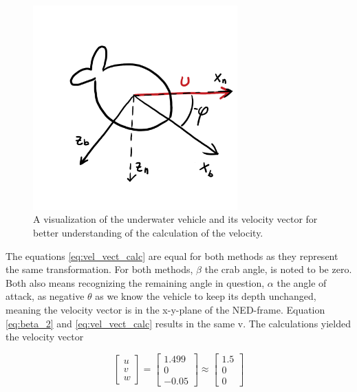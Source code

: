 \begin{figure}[!htb]
	\centering
	\includegraphics[width=0.70\textwidth]{figures/angleOfAttackImg.png}
	\caption{A visualization of the underwater vehicle and its velocity vector for better understanding of the calculation of the velocity.}
\label{fig:angleOfAttackImg}
\end{figure}

The equations \eqref{eq:vel_vect_calc} are equal for both methods as they represent the same transformation. For both methods, $\beta$ the crab angle, is noted to be zero. Both also means recognizing the remaining angle in question, $\alpha$ the angle of attack, as negative $\theta$ as we know the vehicle to keep its depth unchanged, meaning the velocity vector is in the x-y-plane of the NED-frame. Equation \eqref{eq:beta_2} and \eqref{eq:vel_vect_calc} results in the same v. The calculations yielded the velocity vector

\begin{equation}
    \begin{bmatrix}
		u \\
		v \\
		w
	\end{bmatrix}
	= 
	\begin{bmatrix}
		1.499 \\
		0 \\
		-0.05	
	\end{bmatrix}
	\approx 
	\begin{bmatrix}
		1.5 \\
		0 \\
		0	
	\end{bmatrix}
\end{equation}

